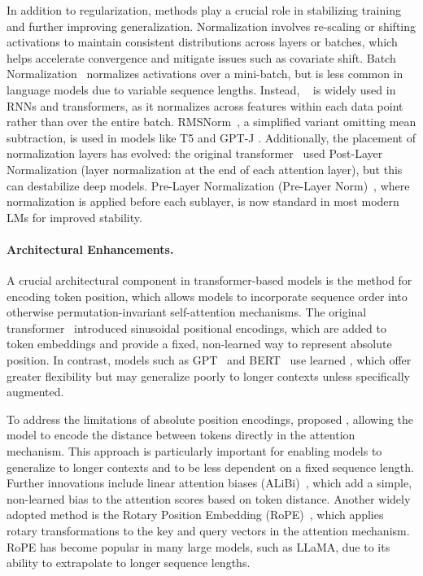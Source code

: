 In addition to regularization,  methods play a crucial role in stabilizing training and further improving generalization. Normalization involves re-scaling or shifting activations to maintain consistent distributions across layers or batches, which helps accelerate convergence and mitigate issues such as  covariate shift. Batch Normalization~\citep{ioffe2015batchnorm} normalizes activations over a mini-batch, but is less common in language models due to variable sequence lengths. Instead, ~\citep{ba2016layernorm} is widely used in RNNs and transformers, as it normalizes across features within each data point rather than over the entire batch. RMSNorm~\citep{zhang2019rmsnorm}, a simplified variant omitting mean subtraction, is used in models like T5 \citep{raffel2020t5} and GPT-J \citep{eleutherai2021gptj}. Additionally, the placement of normalization layers has evolved: the original transformer~\citep{vaswani2017attention} used Post-Layer Normalization (layer normalization at the end of each attention layer), but this can destabilize deep models. Pre-Layer Normalization (Pre-Layer Norm)~\citep{xiong2020layer}, where normalization is applied before each sublayer, is now standard in most modern LMs for improved stability.

\paragraph{Architectural Enhancements.}
A crucial architectural component in transformer-based models is the method for encoding token position, which allows models to incorporate sequence order into otherwise permutation-invariant self-attention mechanisms. The original transformer~\citep{vaswani2017attention} introduced sinusoidal positional encodings, which are added to token embeddings and provide a fixed, non-learned way to represent absolute position. In contrast, models such as GPT~\citep{radford2018gpt1} and BERT~\citep{devlin2019bert} use learned , which offer greater flexibility but may generalize poorly to longer contexts unless specifically augmented.

To address the limitations of absolute position encodings, \citet{shaw2018self} proposed , allowing the model to encode the distance between tokens directly in the attention mechanism. This approach is particularly important for enabling models to generalize to longer contexts and to be less dependent on a fixed sequence length. Further innovations include linear attention biases (ALiBi)~\citep{press2021train}, which add a simple, non-learned bias to the attention scores based on token distance. Another widely adopted method is the Rotary Position Embedding (RoPE)~\citep{su2024rope}, which applies rotary transformations to the key and query vectors in the attention mechanism. RoPE has become popular in many large models, such as LLaMA, due to its ability to extrapolate to longer sequence lengths.

